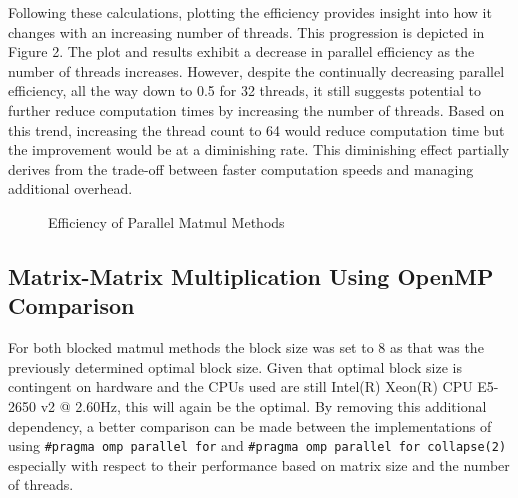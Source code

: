 \documentclass{article}
\begin{document}
\bigskip
\noindent
Following these calculations, plotting the efficiency provides insight into how it changes with an increasing number of threads. This progression is depicted in Figure 2. The plot and results exhibit a decrease in parallel efficiency as the number of threads increases. However, despite the continually decreasing parallel efficiency, all the way down to 0.5 for 32 threads, it still suggests potential to further reduce computation times by increasing the number of threads. Based on this trend, increasing the thread count to 64 would reduce computation time but the improvement would be at a diminishing rate. This diminishing effect partially derives from the trade-off between faster computation speeds and managing additional overhead.

\begin{figure}[!htb]
    \centering
    \caption{Efficiency of Parallel Matmul Methods}
\end{figure}

\subsection{Matrix-Matrix Multiplication Using OpenMP Comparison}

For both blocked matmul methods the block size was set to 8 as that was the previously determined optimal block size. Given that optimal block size is contingent on hardware and the CPUs used are still Intel(R) Xeon(R) CPU E5-2650 v2 @ 2.60Hz, this will again be the optimal. By removing this additional dependency, a better comparison can be made between the implementations of using \texttt{\#pragma omp parallel for} and \texttt{\#pragma omp parallel for collapse(2)} especially with respect to their performance based on matrix size and the number of threads. 
\end{document}
